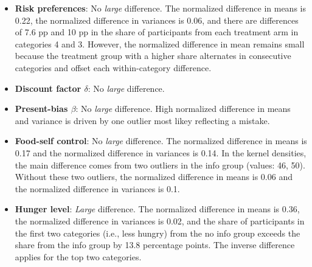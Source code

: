 \documentclass[12pt]{article}
\begin{document}
\begin{itemize}
  \item \textbf{Risk preferences}: No \emph{large} difference.
  The normalized difference in means is 0.22, the normalized difference in variances is 0.06, and there are differences of 7.6 pp and 10 pp in the share of participants from each treatment arm in categories 4 and 3. However, the normalized difference in mean remains small because the treatment group with a higher share alternates in consecutive categories and offset each within-category difference.

  \item \textbf{Discount factor $\delta$}: No \emph{large} difference.

  \item \textbf{Present-bias $\beta$}: No \emph{large} difference.
  High normalized difference in means and variance is driven by one outlier most likey reflecting a mistake.

  \item \textbf{Food-self control}: No \emph{large} difference.
  The normalized difference in means is 0.17 and the normalized difference in variances is 0.14. In the kernel densities, the main difference comes from two outliers in the info group (values: 46, 50). Without these two outliers, the normalized difference in means is 0.06 and the normalized difference in variances is 0.1.

  \item \textbf{Hunger level}: \emph{Large} difference.
  The normalized difference in means is 0.36, the normalized difference in variances is 0.02, and the share of participants in the first two categories (i.e., less hungry) from the no info group exceeds the share from the info group by 13.8 percentage points. The inverse difference applies for the top two categories.
\end{itemize}
\end{document}
